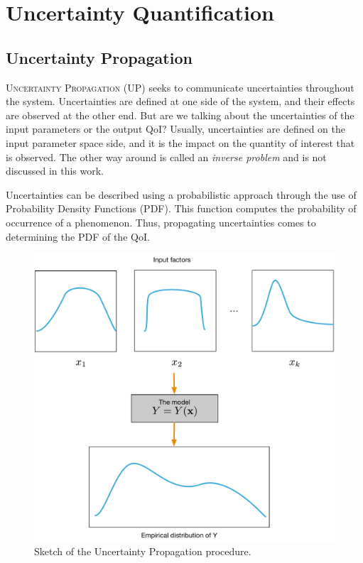 \section{Uncertainty Quantification}\label{sec:uq}

\subsection{Uncertainty Propagation}\label{sec:up}
\lettrine{U}{ncertainty Propagation} (UP) seeks to communicate uncertainties throughout the system. Uncertainties are defined at one side of the system, and their effects are observed at the other end. But are we talking about the uncertainties of the input parameters or the output QoI? Usually, uncertainties are defined on the input parameter space side, and it is the impact on the quantity of interest that is observed. The other way around is called an \emph{inverse problem} and is not discussed in this work.

Uncertainties can be described using a probabilistic approach through the use of Probability Density Functions (PDF). This function computes the probability of occurrence of a phenomenon. Thus, propagating uncertainties comes to determining the PDF of the QoI.

\begin{figure}[!h]
\centering
\includegraphics[width=0.7\linewidth,keepaspectratio]{fig/literature/propagation.pdf}
\caption{Sketch of the Uncertainty Propagation procedure.}
\label{fig:UP}
\end{figure}

